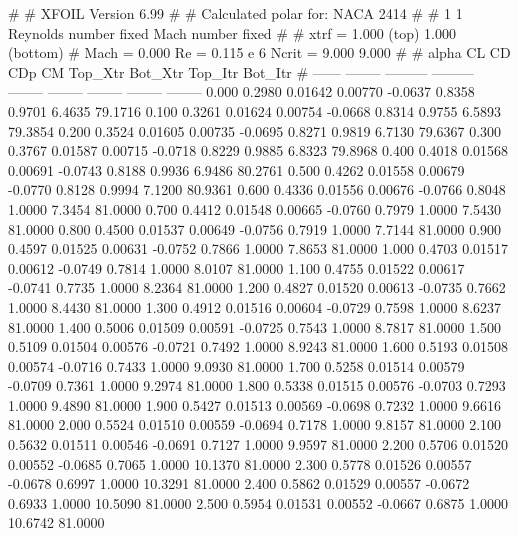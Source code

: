 #  
#       XFOIL         Version 6.99
#  
# Calculated polar for: NACA 2414                                       
#  
# 1 1 Reynolds number fixed          Mach number fixed         
#  
# xtrf =   1.000 (top)        1.000 (bottom)  
# Mach =   0.000     Re =     0.115 e 6     Ncrit =   9.000  9.000
#  
#   alpha    CL        CD       CDp       CM     Top_Xtr  Bot_Xtr  Top_Itr  Bot_Itr
#  ------ -------- --------- --------- -------- -------- -------- -------- --------
   0.000   0.2980   0.01642   0.00770  -0.0637   0.8358   0.9701   6.4635  79.1716
   0.100   0.3261   0.01624   0.00754  -0.0668   0.8314   0.9755   6.5893  79.3854
   0.200   0.3524   0.01605   0.00735  -0.0695   0.8271   0.9819   6.7130  79.6367
   0.300   0.3767   0.01587   0.00715  -0.0718   0.8229   0.9885   6.8323  79.8968
   0.400   0.4018   0.01568   0.00691  -0.0743   0.8188   0.9936   6.9486  80.2761
   0.500   0.4262   0.01558   0.00679  -0.0770   0.8128   0.9994   7.1200  80.9361
   0.600   0.4336   0.01556   0.00676  -0.0766   0.8048   1.0000   7.3454  81.0000
   0.700   0.4412   0.01548   0.00665  -0.0760   0.7979   1.0000   7.5430  81.0000
   0.800   0.4500   0.01537   0.00649  -0.0756   0.7919   1.0000   7.7144  81.0000
   0.900   0.4597   0.01525   0.00631  -0.0752   0.7866   1.0000   7.8653  81.0000
   1.000   0.4703   0.01517   0.00612  -0.0749   0.7814   1.0000   8.0107  81.0000
   1.100   0.4755   0.01522   0.00617  -0.0741   0.7735   1.0000   8.2364  81.0000
   1.200   0.4827   0.01520   0.00613  -0.0735   0.7662   1.0000   8.4430  81.0000
   1.300   0.4912   0.01516   0.00604  -0.0729   0.7598   1.0000   8.6237  81.0000
   1.400   0.5006   0.01509   0.00591  -0.0725   0.7543   1.0000   8.7817  81.0000
   1.500   0.5109   0.01504   0.00576  -0.0721   0.7492   1.0000   8.9243  81.0000
   1.600   0.5193   0.01508   0.00574  -0.0716   0.7433   1.0000   9.0930  81.0000
   1.700   0.5258   0.01514   0.00579  -0.0709   0.7361   1.0000   9.2974  81.0000
   1.800   0.5338   0.01515   0.00576  -0.0703   0.7293   1.0000   9.4890  81.0000
   1.900   0.5427   0.01513   0.00569  -0.0698   0.7232   1.0000   9.6616  81.0000
   2.000   0.5524   0.01510   0.00559  -0.0694   0.7178   1.0000   9.8157  81.0000
   2.100   0.5632   0.01511   0.00546  -0.0691   0.7127   1.0000   9.9597  81.0000
   2.200   0.5706   0.01520   0.00552  -0.0685   0.7065   1.0000  10.1370  81.0000
   2.300   0.5778   0.01526   0.00557  -0.0678   0.6997   1.0000  10.3291  81.0000
   2.400   0.5862   0.01529   0.00557  -0.0672   0.6933   1.0000  10.5090  81.0000
   2.500   0.5954   0.01531   0.00552  -0.0667   0.6875   1.0000  10.6742  81.0000
